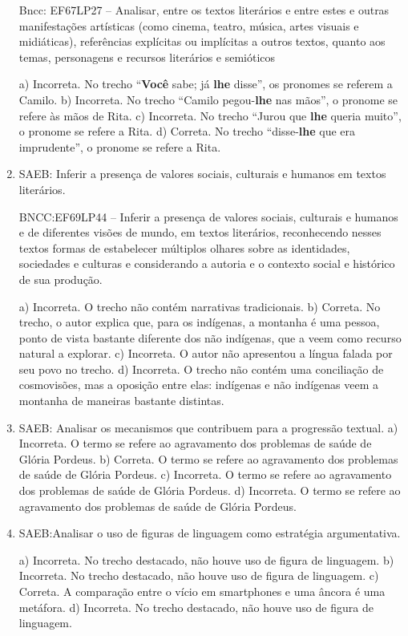 \begin{enumerate}
Bncc: EF67LP27 -- Analisar, entre os textos literários e entre estes e
outras manifestações artísticas (como cinema, teatro, música, artes
visuais e midiáticas), referências explícitas ou implícitas a outros
textos, quanto aos temas, personagens e recursos literários e semióticos

a) Incorreta. No trecho ``\textbf{Você} sabe; já \textbf{lhe} disse'', os pronomes se referem a Camilo.
b) Incorreta. No trecho ``Camilo pegou-\textbf{lhe} nas mãos'', o pronome se refere às mãos de Rita.
c) Incorreta. No trecho ``Jurou que \textbf{lhe} queria muito'', o pronome se refere a Rita.
d) Correta. No trecho ``disse-\textbf{lhe} que era imprudente'', o pronome se refere a Rita.

\item
SAEB: Inferir a presença de valores sociais, culturais e humanos em
textos literários.

BNCC:EF69LP44 -- Inferir a presença de valores sociais, culturais e
humanos e de diferentes visões de mundo, em textos literários,
reconhecendo nesses textos formas de estabelecer múltiplos olhares sobre
as identidades, sociedades e culturas e considerando a autoria e o
contexto social e histórico de sua produção.
 
a) Incorreta. O trecho não contém narrativas tradicionais.
b) Correta. No trecho, o autor explica que, para os indígenas, a montanha é uma pessoa, ponto de vista bastante diferente dos não indígenas, que a veem como recurso natural a explorar. 
c) Incorreta. O autor não apresentou a língua falada por seu povo no trecho. 
d) Incorreta. O trecho não contém uma conciliação de cosmovisões, mas a
oposição entre elas: indígenas e não indígenas veem a montanha de maneiras 
bastante distintas.

\item
SAEB: Analisar os mecanismos que contribuem para a progressão textual.
a) Incorreta. O termo se refere ao agravamento dos problemas de saúde de 
Glória Pordeus. 
b) Correta. O termo se refere ao agravamento dos problemas de saúde de 
Glória Pordeus. 
c) Incorreta. O termo se refere ao agravamento dos problemas de saúde de 
Glória Pordeus. 
d) Incorreta. O termo se refere ao agravamento dos problemas de saúde de 
Glória Pordeus.

\item
SAEB:Analisar o uso de figuras de linguagem como estratégia
argumentativa.

a) Incorreta. No trecho destacado, não houve uso de figura de linguagem.
b) Incorreta. No trecho destacado, não houve uso de figura de linguagem.
c) Correta. A comparação entre o vício em smartphones e uma âncora é uma metáfora. 
d) Incorreta. No trecho destacado, não houve uso de figura de linguagem.


\end{enumerate}
